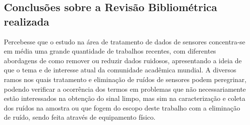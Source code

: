 


\subsection{Conclusões sobre a Revisão Bibliométrica realizada}
Percebesse que o estudo na área de tratamento de dados de sensores concentra-se em média uma grande quantidade de trabalhos recentes, com diferentes abordagens de como remover ou reduzir dados ruidosos, apresentando a ideia de que o tema e de interesse atual da comunidade acadêmica mundial. A diversos ramos nos quais tratamento e eliminação de ruídos de sensores podem peregrinar, podendo verificar a ocorrência dos termos em problemas que não necessariamente estão interessados na obtenção do sinal limpo, mas sim na caracterização e coleta dos ruídos na amostra ou que fogem do escopo deste trabalho com a eliminação de ruído, sendo feita através de equipamento físico. 





